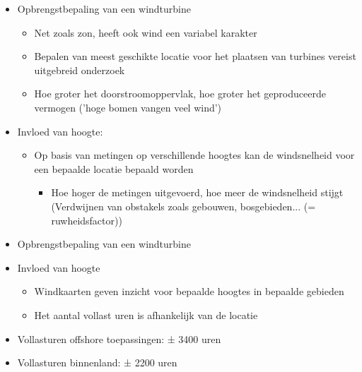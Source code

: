 \documentclass[12pt]{article}
\begin{document}
\begin{itemize}
    \item Opbrengstbepaling van een windturbine\begin{itemize}
        \item Net zoals zon, heeft ook wind een variabel karakter
        \item Bepalen van meest geschikte locatie voor het plaatsen van turbines vereist uitgebreid onderzoek
        \item Hoe groter het doorstroomoppervlak, hoe groter het geproduceerde vermogen ('hoge bomen vangen veel wind')
    \end{itemize}
    \item Invloed van hoogte:\begin{itemize}
        \item Op basis van metingen op verschillende hoogtes kan de windsnelheid voor een bepaalde locatie bepaald worden\begin{itemize}
            \item Hoe hoger de metingen uitgevoerd, hoe meer de windsnelheid stijgt (Verdwijnen van obstakels zoals gebouwen, bosgebieden... (= ruwheidsfactor))
        \end{itemize}
    \end{itemize}
    \item Opbrengstbepaling van een windturbine
    \item Invloed van hoogte\begin{itemize}
        \item Windkaarten geven inzicht voor bepaalde hoogtes in bepaalde gebieden
        \item Het aantal vollast uren is afhankelijk van de locatie
    \end{itemize}
    \item Vollasturen offshore toepassingen: ± 3400 uren
    \item Vollasturen binnenland: ± 2200 uren
\end{itemize}
\end{document}

